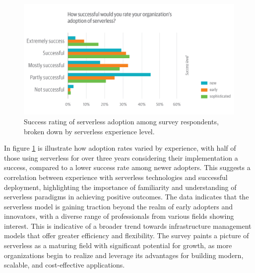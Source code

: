 \begin{figure}
    \centering
    \includegraphics[scale=0.2]{Pictures/3_serverless_adoption_rating.png}
    \caption{Success rating of serverless adoption among survey respondents, broken down by serverless experience level.}
    \label{fig:3_serverless_adoption_rating}
\end{figure}

In figure \ref{fig:3_serverless_adoption_rating} is illustrate how adoption rates varied by
experience, with half of those using serverless for over three years considering their
implementation a success, compared to a lower success rate among newer adopters. This suggests a
correlation between experience with serverless technologies and successful deployment, highlighting
the importance of familiarity and understanding of serverless paradigms in achieving positive
outcomes.
\newline\newline
The data indicates that the serverless model is gaining traction beyond the realm of
early adopters and innovators, with a diverse range of professionals from various fields showing
interest. This is indicative of a broader trend towards infrastructure management models that offer
greater efficiency and flexibility. The survey paints a picture of serverless as a maturing
field with significant potential for growth, as more organizations begin to realize and leverage its
advantages for building modern, scalable, and cost-effective applications.

